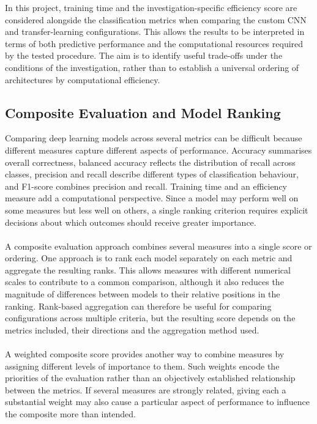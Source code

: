 \documentclass[12pt, a4paper]{report}
\let\oldsubsection\subsection
\renewcommand{\subsection}{%
    \Needspace{6\baselineskip}%
    \oldsubsection
}
\begin{document}
				In this project, training time and the investigation-specific efficiency score are considered alongside the classification metrics when comparing the custom CNN and transfer-learning configurations. This allows the results to be interpreted in terms of both predictive performance and the computational resources required by the tested procedure. The aim is to identify useful trade-offs under the conditions of the investigation, rather than to establish a universal ordering of architectures by computational efficiency.
				
			\subsection{Composite Evaluation and Model Ranking}
				
				Comparing deep learning models across several metrics can be difficult because different measures capture different aspects of performance. Accuracy summarises overall correctness, balanced accuracy reflects the distribution of recall across classes, precision and recall describe different types of classification behaviour, and F1-score combines precision and recall. Training time and an efficiency measure add a computational perspective. Since a model may perform well on some measures but less well on others, a single ranking criterion requires explicit decisions about which outcomes should receive greater importance.\\\\
				A composite evaluation approach combines several measures into a single score or ordering. One approach is to rank each model separately on each metric and aggregate the resulting ranks. This allows measures with different numerical scales to contribute to a common comparison, although it also reduces the magnitude of differences between models to their relative positions in the ranking. Rank-based aggregation can therefore be useful for comparing configurations across multiple criteria, but the resulting score depends on the metrics included, their directions and the aggregation method used.\\\\
				A weighted composite score provides another way to combine measures by assigning different levels of importance to them. Such weights encode the priorities of the evaluation rather than an objectively established relationship between the metrics. If several measures are strongly related, giving each a substantial weight may also cause a particular aspect of performance to influence the composite more than intended.\\\\
\end{document}

